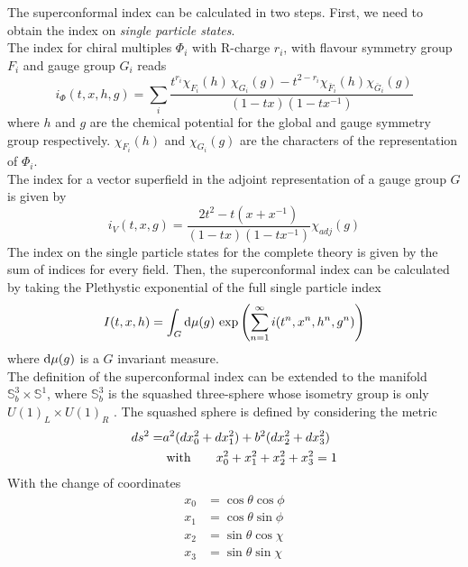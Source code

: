The superconformal index can be calculated in two steps.
First, we need to obtain the index on \emph{single particle states}.\\
The index for chiral multiples $\Phi_i$ with R-charge $r_i$, with flavour symmetry group $F_i$ and gauge group $G_i$ reads \cite{Dolan:2008qi}
\begin{equation}
i_{\Phi}(t,x,h,g) = \sum_{i} \frac{ t^{r_i} \chi_{F_i}(h) \, \chi_{G_i}(g) - t^{2-r_i} \chi_{\bar{F}_i}(h) \chi_{\bar{G}_i}(g)}{ (1-tx) (1- t x^{-1})}
\end{equation}
where $h$ and $g$ are the chemical potential for the global and gauge symmetry group respectively. $\chi_{F_i}(h)$ and $\chi_{G_i}(g)$ are the characters of the representation of $\Phi_i$.\\
The index for a vector superfield in the adjoint representation of a gauge group $G$ is given by \cite{Dolan:2008qi}
\begin{equation}
i_{V} (t,x,g) = \frac{2 t^2 - t(x + x^{-1})}{(1-tx) (1 - tx^{-1})} \chi_{adj}(g)
\end{equation}
The index on the single particle states for the complete theory is given by the sum of indices for every field. 
Then, the superconformal index can be calculated by taking the Plethystic exponential \cite{Feng:2007ur} of the full single particle index
\begin{equation}
  I(t,x,h) = \int_{G} \hbox{d} \mu(g)\,  \exp{ \left(  \sum_{n=1}^{\infty}i(t^n,x^n,h^n,g^n) \right)}
  \end{equation}  
where $\hbox{d} \mu(g)$ is a $G$ invariant measure.\\
The definition of the superconformal index can be extended to the manifold $\mathbb{S}_b^3 \times \mathbb{S}^1$, where $\mathbb{S}_b^3$ is the squashed three-sphere whose isometry group is only $U(1)_L \times U(1)_R$ \cite{Hama:2011ea}.
The squashed sphere is defined by considering the metric 
\begin{align}
 d s^2 =& a^2 ( d x_0^2 + d x_1^2 ) + b^2 ( d x_2^2 + d x_3^2) \\
 & \; \hbox{with} \qquad  x_0^2 + x_1^2 + x_2^2 + x_3^2 = 1
\end{align}
With the change of coordinates 
\begin{align}
x_0  & =  \cos \theta \cos \phi \\
x_1  & = \cos \theta \sin \phi \\
x_2  & = \sin \theta \cos \chi \\
x_3  & = \sin \theta \sin \chi 
\end{align}

